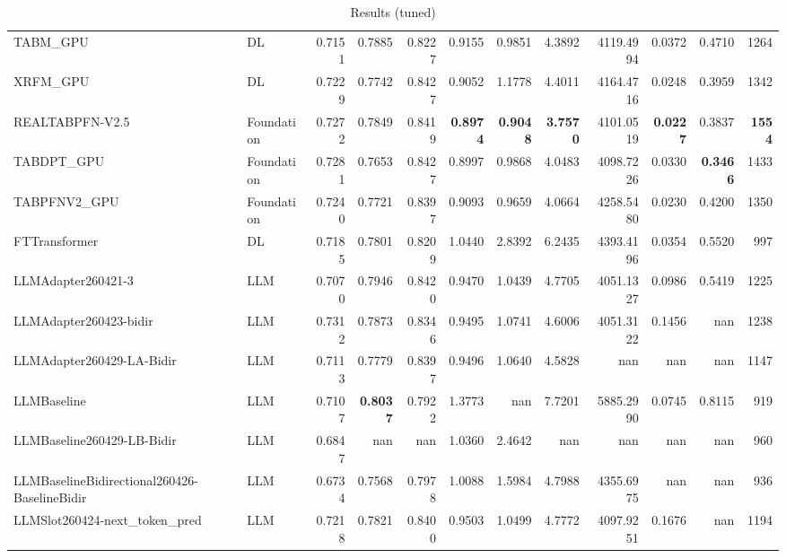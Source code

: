 \begin{table}[htbp]
{\begin{tabular}{ll|rrrrrrrrr|r}
TABM\_GPU & DL & 0.7151 & 0.7885 & 0.8227 & 0.9155 & 0.9851 & 4.3892 & 4119.4994 & 0.0372 & 0.4710 & 1264 \\
XRFM\_GPU & DL & 0.7229 & 0.7742 & 0.8427 & 0.9052 & 1.1778 & 4.4011 & 4164.4716 & 0.0248 & 0.3959 & 1342 \\
REALTABPFN-V2.5 & Foundation & 0.7272 & 0.7849 & 0.8419 & \textbf{0.8974} & \textbf{0.9048} & \textbf{3.7570} & 4101.0519 & \textbf{0.0227} & 0.3837 & \textbf{1554} \\
TABDPT\_GPU & Foundation & 0.7281 & 0.7653 & 0.8427 & 0.8997 & 0.9868 & 4.0483 & 4098.7226 & 0.0330 & \textbf{0.3466} & 1433 \\
TABPFNV2\_GPU & Foundation & 0.7240 & 0.7721 & 0.8397 & 0.9093 & 0.9659 & 4.0664 & 4258.5480 & 0.0230 & 0.4200 & 1350 \\
\midrule
FTTransformer & DL & 0.7185 & 0.7801 & 0.8209 & 1.0440 & 2.8392 & 6.2435 & 4393.4196 & 0.0354 & 0.5520 & 997 \\
LLMAdapter260421-3 & LLM & 0.7070 & 0.7946 & 0.8420 & 0.9470 & 1.0439 & 4.7705 & 4051.1327 & 0.0986 & 0.5419 & 1225 \\
LLMAdapter260423-bidir & LLM & 0.7312 & 0.7873 & 0.8346 & 0.9495 & 1.0741 & 4.6006 & 4051.3122 & 0.1456 & nan & 1238 \\
LLMAdapter260429-LA-Bidir & LLM & 0.7113 & 0.7779 & 0.8397 & 0.9496 & 1.0640 & 4.5828 & nan & nan & nan & 1147 \\
LLMBaseline & LLM & 0.7107 & \textbf{0.8037} & 0.7922 & 1.3773 & nan & 7.7201 & 5885.2990 & 0.0745 & 0.8115 & 919 \\
LLMBaseline260429-LB-Bidir & LLM & 0.6847 & nan & nan & 1.0360 & 2.4642 & nan & nan & nan & nan & 960 \\
LLMBaselineBidirectional260426-BaselineBidir & LLM & 0.6734 & 0.7568 & 0.7978 & 1.0088 & 1.5984 & 4.7988 & 4355.6975 & nan & nan & 936 \\
LLMSlot260424-next\_token\_pred & LLM & 0.7218 & 0.7821 & 0.8400 & 0.9503 & 1.0499 & 4.7772 & 4097.9251 & 0.1676 & nan & 1194 \\
\bottomrule
\end{tabular}
}
\caption{Results (tuned)}
\label{tab:results_tuned}
\end{table}